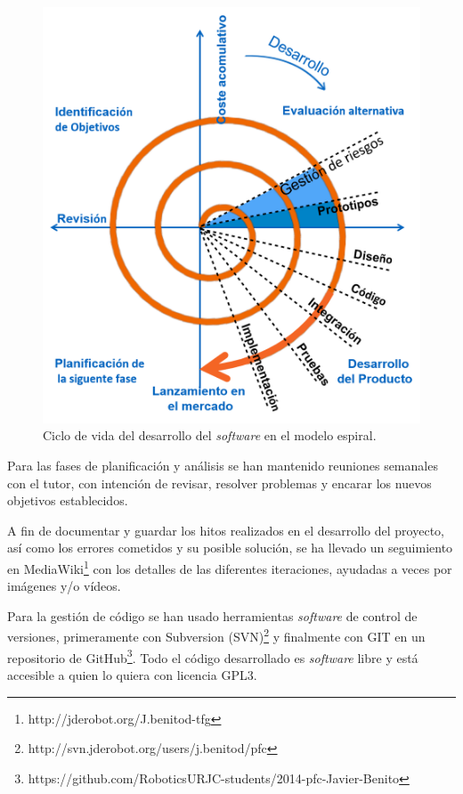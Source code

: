 \begin{figure}[th]
\centering
\includegraphics[scale=0.62]{Figures/spiral.png}
\decoRule
\caption[Ciclo de vida en espiral]{Ciclo de vida del desarrollo del \textit{software} en el modelo espiral.}
\label{fig:spiral}
\end{figure}

Para las fases de planificación y análisis se han mantenido reuniones semanales con el tutor, con intención de revisar, resolver problemas y encarar los nuevos objetivos establecidos.

A fin de documentar y guardar los hitos realizados en el desarrollo del proyecto, así como los errores cometidos y su posible solución, se ha llevado un seguimiento en MediaWiki\footnote{http://jderobot.org/J.benitod-tfg} con los detalles de las diferentes iteraciones, ayudadas a veces por imágenes y/o vídeos.

Para la gestión de código se han usado herramientas \textit{software} de control de versiones, primeramente con Subversion (SVN)\footnote{http://svn.jderobot.org/users/j.benitod/pfc} y finalmente con GIT en un repositorio de GitHub\footnote{https://github.com/RoboticsURJC-students/2014-pfc-Javier-Benito}. Todo el código desarrollado es \textit{software} libre y está accesible a quien lo quiera con licencia GPL3.

